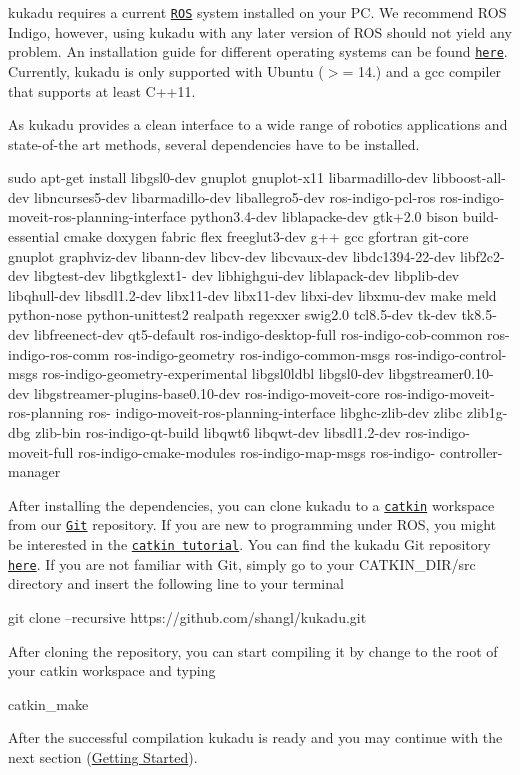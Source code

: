 kukadu requires a current \href{http://www.ros.org/}{\tt R\-O\-S} system installed on your P\-C. We recommend R\-O\-S Indigo, however, using kukadu with any later version of R\-O\-S should not yield any problem. An installation guide for different operating systems can be found \href{http://wiki.ros.org/indigo/Installation}{\tt here}. Currently, kukadu is only supported with Ubuntu ($>$= 14.) and a gcc compiler that supports at least C++11.

As kukadu provides a clean interface to a wide range of robotics applications and state-\/of-\/the art methods, several dependencies have to be installed.


\begin{DoxyCode}
sudo apt-\textcolor{keyword}{get} install libgsl0-dev gnuplot gnuplot-x11 libarmadillo-dev libboost-all-dev libncurses5-dev 
      libarmadillo-dev liballegro5-dev ros-indigo-pcl-ros ros-indigo-moveit-ros-planning-\textcolor{keyword}{interface }python3.4-dev 
      liblapacke-dev gtk+2.0 bison build-essential cmake doxygen fabric flex freeglut3-dev g++ gcc gfortran git-core 
      gnuplot graphviz-dev libann-dev libcv-dev libcvaux-dev libdc1394-22-dev libf2c2-dev libgtest-dev libgtkglext1-
      dev libhighgui-dev liblapack-dev libplib-dev libqhull-dev libsdl1.2-dev libx11-dev libx11-dev libxi-dev 
      libxmu-dev make meld python-nose python-unittest2 realpath regexxer swig2.0 tcl8.5-dev tk-dev tk8.5-dev 
      libfreenect-dev qt5-default ros-indigo-desktop-full ros-indigo-cob-common ros-indigo-ros-comm ros-indigo-geometry 
      ros-indigo-common-msgs ros-indigo-control-msgs ros-indigo-geometry-experimental libgsl0ldbl libgsl0-dev 
      libgstreamer0.10-dev libgstreamer-plugins-base0.10-dev ros-indigo-moveit-core ros-indigo-moveit-ros-planning ros-
      indigo-moveit-ros-planning-interface libghc-zlib-dev zlibc zlib1g-dbg zlib-bin ros-indigo-qt-build libqwt6 
      libqwt-dev libsdl1.2-dev ros-indigo-moveit-full ros-indigo-cmake-modules ros-indigo-map-msgs ros-indigo-
      controller-manager
\end{DoxyCode}


After installing the dependencies, you can clone kukadu to a \href{http://wiki.ros.org/catkin}{\tt catkin} workspace from our \href{https://git-scm.com/}{\tt Git} repository. If you are new to programming under R\-O\-S, you might be interested in the \href{http://wiki.ros.org/catkin/Tutorials}{\tt catkin tutorial}. You can find the kukadu Git repository \href{https://github.com/shangl/kukadu}{\tt here}. If you are not familiar with Git, simply go to your C\-A\-T\-K\-I\-N\-\_\-\-D\-I\-R/src directory and insert the following line to your terminal 
\begin{DoxyCode}
git clone --recursive https:\textcolor{comment}{//github.com/shangl/kukadu.git}
\end{DoxyCode}
 After cloning the repository, you can start compiling it by change to the root of your catkin workspace and typing 
\begin{DoxyCode}
catkin\_make
\end{DoxyCode}
 After the successful compilation kukadu is ready and you may continue with the next section (\hyperlink{gettingstartedpage}{Getting Started}). 